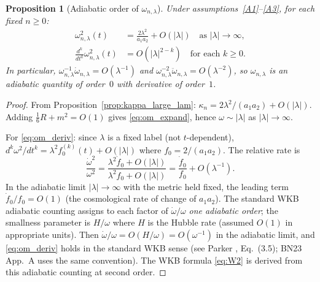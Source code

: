 \documentclass[11pt,a4paper]{article}
\newtheorem{proposition}[theorem]{Proposition}
\theoremstyle{definition}
\begin{document}
\begin{proposition}[Adiabatic order of $\omega_{n,\lambda}$]\label{prop:omega_adiab}
Under assumptions~\ref{A1}--\ref{A3}, for each fixed $n \geq 0$:
\begin{align}
  \omega_{n,\lambda}^2(t) &= \frac{2\lambda^2}{a_1 a_2} + O(|\lambda|) \quad
    \text{as } |\lambda| \to \infty, \label{eq:om_expand} \\
  \frac{d^k}{dt^k} \omega_{n,\lambda}^2(t) &= O(|\lambda|^{2-k})
    \quad \text{for each } k \geq 0. \label{eq:om_deriv}
\end{align}
In particular, $\omega_{n,\lambda}^{-1}\dot\omega_{n,\lambda} = O(\lambda^{-1})$
and $\omega_{n,\lambda}^{-2}\ddot\omega_{n,\lambda} = O(\lambda^{-2})$, so
$\omega_{n,\lambda}$ is an adiabatic quantity of order~$0$ with derivative of order~$1$.
\end{proposition}

\begin{proof}
From Proposition~\ref{prop:kappa_large_lam}: $\kappa_n = 2\lambda^2/(a_1 a_2) + O(|\lambda|)$.
Adding $\tfrac{1}{6}R + m^2 = O(1)$ gives \eqref{eq:om_expand}, hence $\omega \sim |\lambda|$
as $|\lambda| \to \infty$.

For \eqref{eq:om_deriv}: since $\lambda$ is a fixed label (not $t$-dependent),
$d^k\omega^2/dt^k = \lambda^2 f_0^{(k)}(t) + O(|\lambda|)$ where $f_0 = 2/(a_1 a_2)$.
The relative rate is
\[
  \frac{\dot\omega^2}{\omega^2}
  = \frac{\lambda^2 \dot f_0 + O(|\lambda|)}{\lambda^2 f_0 + O(|\lambda|)}
  = \frac{\dot f_0}{f_0} + O(\lambda^{-1}).
\]
In the adiabatic limit $|\lambda| \to \infty$ with the metric held fixed,
the leading term $\dot f_0 / f_0 = O(1)$ (the cosmological rate of change of $a_1 a_2$).
The standard WKB adiabatic counting assigns to each factor of $\dot\omega/\omega$
\emph{one adiabatic order}; the smallness parameter is $H/\omega$ where $H$ is the
Hubble rate (assumed $O(1)$ in appropriate units).
Then $\dot\omega/\omega = O(H/\omega) = O(\omega^{-1})$ in the adiabatic limit,
and \eqref{eq:om_deriv} holds in the standard WKB sense (see Parker \cite{Par69},
Eq.~(3.5); BN23 App.~A uses the same convention).
The WKB formula \eqref{eq:W2} is derived from this adiabatic counting at second order.
\end{proof}
\end{document}
